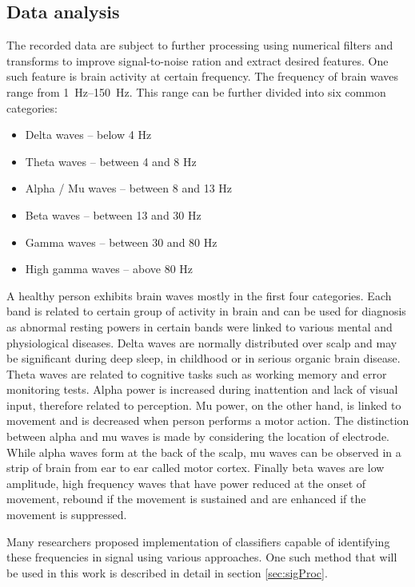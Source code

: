 \subsection{Data analysis}
\label{sub:dataAnalysis}
The recorded data are subject to further processing using numerical filters and
transforms to improve signal-to-noise ration and extract desired features. 
One such feature is brain activity at certain frequency. The frequency of brain
waves range from \SIrange{1}{150}{\Hz}. This range can be further divided
into six common categories\cite{dominantF}:
\begin{itemize}
  \item Delta waves -- below 4 Hz
  \item Theta waves -- between 4 and 8 Hz
  \item Alpha / Mu waves -- between 8 and 13 Hz
  \item Beta waves -- between 13 and 30 Hz
  \item Gamma waves -- between 30 and 80 Hz
  \item High gamma waves -- above 80 Hz
\end{itemize}
A healthy person exhibits brain waves mostly in the first four categories. Each
band is related to certain group of activity in brain and can be used for
diagnosis as abnormal resting powers in certain bands were linked to various
mental and physiological diseases. \cite{dominantF} Delta waves are normally
distributed over scalp and may be significant during deep sleep, in childhood or
in serious organic brain disease. \cite{eegClass} Theta waves are related to
cognitive tasks such as working memory and error monitoring tests. Alpha power
is increased during inattention and lack of visual input, therefore related to
perception. Mu power, on the other hand, is linked to movement and is decreased
when person performs a motor action. The distinction between alpha and mu waves
is made by considering the location of electrode. While alpha waves form at the
back of the scalp, mu waves can be observed in a strip of brain from ear to ear
called motor cortex. Finally beta waves are low amplitude, high frequency waves
that have power reduced at the onset of movement, rebound if the movement is
sustained and are enhanced if the movement is suppressed. \cite{dominantF}

Many researchers proposed implementation of classifiers capable of identifying
these frequencies in signal using various approaches. One such method that will
be used in this work is described in detail in section \ref{sec:sigProc}.

